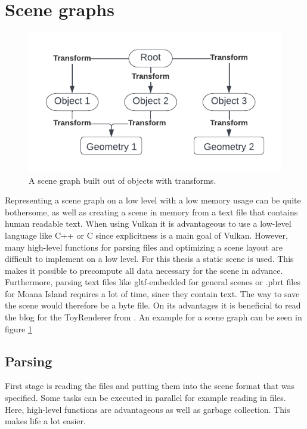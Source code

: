 \section{Scene graphs}
\label{sec:SceneGraph}
\begin{figure}
    \centering
    \includegraphics[width=.5\textwidth]{images/showcase/Scenegraph.pdf}
    \caption{A scene graph built out of objects with transforms.}
    \label{fig:SceneGraph}
\end{figure}
Representing a scene graph on a low level with a low memory usage can be quite bothersome, as well as creating a scene in memory from a text file that contains human readable text. When using Vulkan it is advantageous to use a low-level language like C++ or C since explicitness is a main goal of Vulkan. However, many high-level functions for parsing files and optimizing a scene layout are difficult to implement on a low level. For this thesis a static scene is used. This makes it possible to precompute all data necessary for the scene in advance. Furthermore, parsing text files like gltf-embedded for general scenes or .pbrt files for Moana Island requires a lot of time, since they contain text. The way to save the scene would therefore be a byte file. On its advantages it is beneficial to read the blog for the ToyRenderer from \cite{momentsingraphics}. An example for a scene graph can be seen in figure \ref{fig:SceneGraph}
\subsection{Parsing}
First stage is reading the files and putting them into the scene format that was specified. Some tasks can be executed in parallel for example reading in files. Here, high-level functions are advantageous as well as garbage collection. This makes life a lot easier.
\newpage
